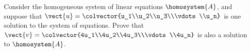 Consider the homogeneous system of linear equations $\homosystem{A}$, and suppose that
$\vect{u}=\colvector{u_1\\u_2\\u_3\\\vdots\\u_n}$ 
is one solution to the system of equations.  Prove that 
$\vect{v}=\colvector{4u_1\\4u_2\\4u_3\\\vdots\\4u_n}$ is also a solution to $\homosystem{A}$.